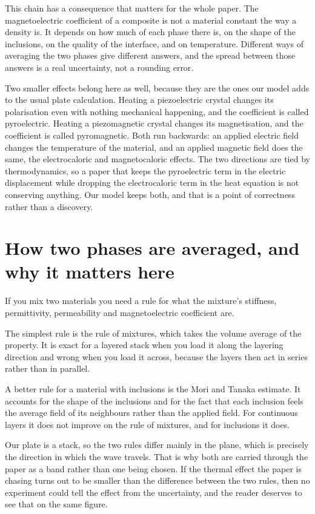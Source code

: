 \documentclass[11pt]{article}
\begin{document}
This chain has a consequence that matters for the whole paper. The magnetoelectric coefficient of a composite
is not a material constant the way a density is. It depends on how much of each phase there is, on the shape of
the inclusions, on the quality of the interface, and on temperature. Different ways of averaging the two phases
give different answers, and the spread between those answers is a real uncertainty, not a rounding error.

Two smaller effects belong here as well, because they are the ones our model adds to the usual plate
calculation. Heating a piezoelectric crystal changes its polarisation even with nothing mechanical happening,
and the coefficient is called pyroelectric. Heating a piezomagnetic crystal changes its magnetisation, and the
coefficient is called pyromagnetic. Both run backwards: an applied electric field changes the temperature of
the material, and an applied magnetic field does the same, the electrocaloric and magnetocaloric effects. The
two directions are tied by thermodynamics, so a paper that keeps the pyroelectric term in the electric
displacement while dropping the electrocaloric term in the heat equation is not conserving anything. Our model
keeps both, and that is a point of correctness rather than a discovery.

\section{How two phases are averaged, and why it matters here}

If you mix two materials you need a rule for what the mixture's stiffness, permittivity, permeability and
magnetoelectric coefficient are.

The simplest rule is the rule of mixtures, which takes the volume average of the property. It is exact for a
layered stack when you load it along the layering direction and wrong when you load it across, because the
layers then act in series rather than in parallel.

A better rule for a material with inclusions is the Mori and Tanaka estimate. It accounts for the shape of the
inclusions and for the fact that each inclusion feels the average field of its neighbours rather than the
applied field. For continuous layers it does not improve on the rule of mixtures, and for inclusions it does.

Our plate is a stack, so the two rules differ mainly in the plane, which is precisely the direction in which
the wave travels. That is why both are carried through the paper as a band rather than one being chosen. If
the thermal effect the paper is chasing turns out to be smaller than the difference between the two rules,
then no experiment could tell the effect from the uncertainty, and the reader deserves to see that on the same
figure.
\end{document}
